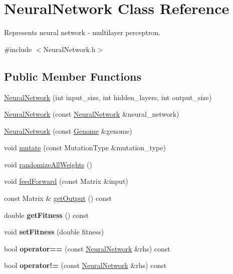 \hypertarget{classNeuralNetwork}{}\section{Neural\+Network Class Reference}
\label{classNeuralNetwork}


Represents neural network -\/ multilayer perceptron.  




{\ttfamily \#include $<$Neural\+Network.\+h$>$}

\subsection*{Public Member Functions}
\begin{DoxyCompactItemize}
\item 
\hyperlink{classNeuralNetwork_a246f904545417df2801e56277ab8d53f}{Neural\+Network} (int input\+\_\+size, int hidden\+\_\+layers, int output\+\_\+size)
\item 
\hyperlink{classNeuralNetwork_a9b688c5f00977e83fedea7ee021348f1}{Neural\+Network} (const \hyperlink{classNeuralNetwork}{Neural\+Network} \&neural\+\_\+network)
\item 
\hyperlink{classNeuralNetwork_a772972afe658adbb165af9e8b384e552}{Neural\+Network} (const \hyperlink{classGenome}{Genome} \&genome)
\item 
void \hyperlink{classNeuralNetwork_a95ce793f6206c627f4d436be8348eede}{mutate} (const Mutation\+Type \&mutation\+\_\+type)
\item 
void \hyperlink{classNeuralNetwork_a94e3233f8f2f6c2f1e205b67ddca7adf}{randomize\+All\+Weights} ()
\item 
void \hyperlink{classNeuralNetwork_a06a48c985365b4f933d0abe8dc894a1c}{feed\+Forward} (const Matrix \&input)
\item 
const Matrix \& \hyperlink{classNeuralNetwork_a151d07a86bcb717704c3ff8a2f6f35ad}{get\+Output} () const 
\item 
double {\bfseries get\+Fitness} () const \hypertarget{classNeuralNetwork_a6a8e4dfa1a2efcb63a576cac81fb9fe4}{}\label{classNeuralNetwork_a6a8e4dfa1a2efcb63a576cac81fb9fe4}

\item 
void {\bfseries set\+Fitness} (double fitness)\hypertarget{classNeuralNetwork_a9be745ebf5c3f469791439aee1835b0a}{}\label{classNeuralNetwork_a9be745ebf5c3f469791439aee1835b0a}

\item 
bool {\bfseries operator==} (const \hyperlink{classNeuralNetwork}{Neural\+Network} \&rhs) const \hypertarget{classNeuralNetwork_a2a3aff2fe2ee178914a3676ad4c88c51}{}\label{classNeuralNetwork_a2a3aff2fe2ee178914a3676ad4c88c51}

\item 
bool {\bfseries operator!=} (const \hyperlink{classNeuralNetwork}{Neural\+Network} \&rhs) const \hypertarget{classNeuralNetwork_ae5ac2160c59e9b38d551bff997e52645}{}\label{classNeuralNetwork_ae5ac2160c59e9b38d551bff997e52645}

\end{DoxyCompactItemize}
